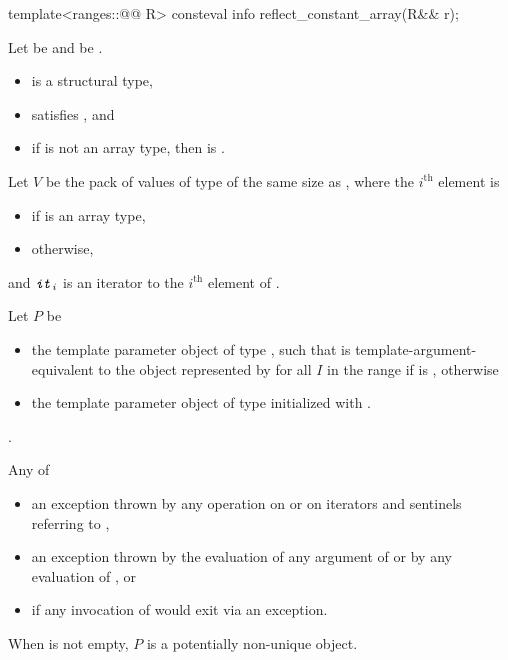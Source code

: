 %
\begin{itemdecl}
template<ranges::@@ R>
  consteval info reflect_constant_array(R&& r);
\end{itemdecl}

\begin{itemdescr}
\pnum
Let  be  and
 be .

\pnum
\mandates
\begin{itemize}
\item {} is a structural type,
\item {} satisfies , and
\item
if  is not an array type, then
 is .
\end{itemize}

\pnum
Let $V$ be the pack of values of type 
of the same size as ,
where the $i^\text{th}$ element is
\begin{itemize}
\item
{}
if  is an array type,
\item
{}
otherwise,
\end{itemize}
and $\tcode{\placeholder{it}}_i$ is an iterator to
the $i^\text{th}$ element of .

\pnum
Let $P$ be
\begin{itemize}
\item
  the template parameter object
  of type ,
  such that  is template-argument-equivalent
  to the object represented by 
  for all $I$ in the range 
  if  is , otherwise
\item
  the template parameter object of type 
  initialized with \tcode{\{\}}.
\end{itemize}

\pnum
\returns
{}.

\pnum
\throws
Any of
\begin{itemize}
\item
an exception thrown by any operation
on  or
on iterators and sentinels referring to ,
\item
an exception thrown
by the evaluation of any argument of  or
by any evaluation of , or
\item
{}
if any invocation of 
would exit via an exception.
\end{itemize}

\pnum
\begin{note}
When  is not empty, $P$ is a potentially non-unique object.
\end{note}
\end{itemdescr}

